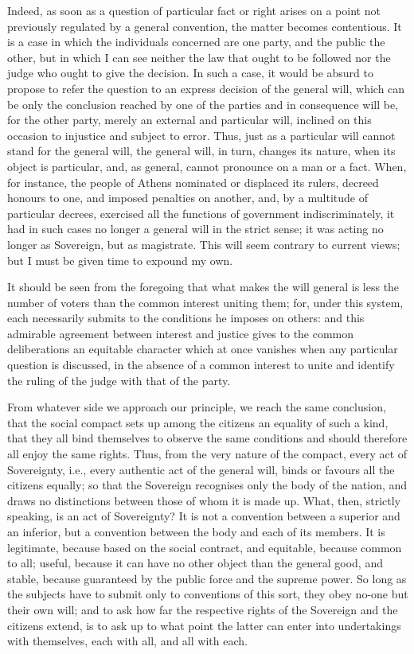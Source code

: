 \documentclass[12pt]{report}
\begin{document}
Indeed, as soon as a question of particular fact or right arises on a point not previously regulated by a general convention, the matter becomes contentious. It is a case in which the individuals concerned are one party, and the public the other, but in which I can see neither the law that ought to be followed nor the judge who ought to give the decision. In such a case, it would be absurd to propose to refer the question to an express decision of the general will, which can be only the conclusion reached by one of the parties and in consequence will be, for the other party, merely an external and particular will, inclined on this occasion to injustice and subject to error. Thus, just as a particular will cannot stand for the general will, the general will, in turn, changes its nature, when its object is particular, and, as general, cannot pronounce on a man or a fact. When, for instance, the people of Athens nominated or displaced its rulers, decreed honours to one, and imposed penalties on another, and, by a multitude of particular decrees, exercised all the functions of government indiscriminately, it had in such cases no longer a general will in the strict sense; it was acting no longer as Sovereign, but as magistrate. This will seem contrary to current views; but I must be given time to expound my own.

It should be seen from the foregoing that what makes the will general is less the number of voters than the common interest uniting them; for, under this system, each necessarily submits to the conditions he imposes on others: and this admirable agreement between interest and justice gives to the common deliberations an equitable character which at once vanishes when any particular question is discussed, in the absence of a common interest to unite and identify the ruling of the judge with that of the party.

From whatever side we approach our principle, we reach the same conclusion, that the social compact sets up among the citizens an equality of such a kind, that they all bind themselves to observe the same conditions and should therefore all enjoy the same rights. Thus, from the very nature of the compact, every act of Sovereignty, i.e., every authentic act of the general will, binds or favours all the citizens equally; so that the Sovereign recognises only the body of the nation, and draws no distinctions between those of whom it is made up. What, then, strictly speaking, is an act of Sovereignty? It is not a convention between a superior and an inferior, but a convention between the body and each of its members. It is legitimate, because based on the social contract, and equitable, because common to all; useful, because it can have no other object than the general good, and stable, because guaranteed by the public force and the supreme power. So long as the subjects have to submit only to conventions of this sort, they obey no-one but their own will; and to ask how far the respective rights of the Sovereign and the citizens extend, is to ask up to what point the latter can enter into undertakings with themselves, each with all, and all with each.
\end{document}
